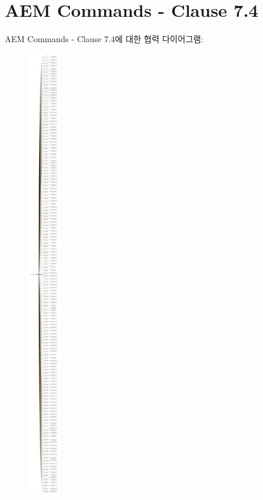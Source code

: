 \hypertarget{group__aem__command}{}\section{A\+EM Commands -\/ Clause 7.4}
\label{group__aem__command}
A\+EM Commands -\/ Clause 7.4에 대한 협력 다이어그램\+:
\nopagebreak
\begin{figure}[H]
\begin{center}
\leavevmode
\includegraphics[height=550pt]{group__aem__command}
\end{center}
\end{figure}
